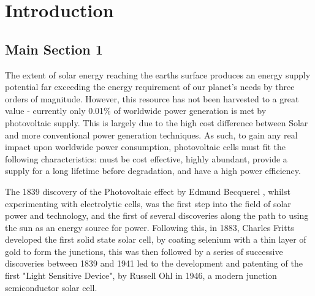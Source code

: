 
\chapter{Introduction} %

\label{Chapter1} %



\section{Main Section 1}

The extent of solar energy reaching the earths surface produces an energy supply potential far exceeding the energy requirement of our planet's needs by three orders of magnitude. \citep{morton_solar_2006} However, this resource has not been harvested to a great value - currently only 0.01\% of worldwide power generation is met by photovoltaic supply. \citep{mitzi_path_2011} This is largely due to the high cost difference between Solar and more conventional power generation techniques. As such, to gain any real impact upon worldwide power consumption, photovoltaic cells must fit the following characteristics: must be cost effective, highly abundant, provide a supply for a long lifetime before degradation, and have a high power efficiency.

The 1839 discovery of the Photovoltaic effect by Edmund Becquerel \citep{_photovoltaics_????}, whilst experimenting with electrolytic cells, was the first step into the field of solar power and technology, and the first of several discoveries along the path to using the sun as an energy source for power. Following this, in 1883, Charles Fritts \citep{fritts_new_1883} developed the first solid state solar cell, by coating selenium with a thin layer of gold to form the junctions, this was then followed by a series of successive discoveries between 1839 and 1941 led to the development and patenting of the first "Light Sensitive Device", by Russell Ohl in 1946, a modern junction semiconductor solar cell. \citep{green_path_2009} 

